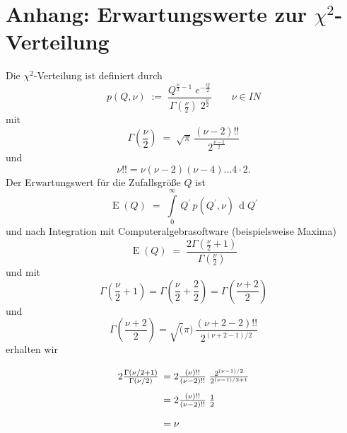 \section{Anhang: Erwartungswerte zur $\chi^2$-Verteilung}
\label{ErwaChi2}
Die $\chi^2$-Verteilung ist definiert durch
\begin{equation}
p(Q,\nu) \; := \; \frac{ Q^{\frac{\nu}{2}-1} \; e^{-\frac{Q}{2}}}
{\Gamma\left(\frac{\nu}{2}\right) \; 2^{\frac{\nu}{2}}} \qquad \nu \in I \! \! N
\end{equation}
mit
\begin{equation}
\Gamma\left(\frac{\nu}{2}\right) \; = \; \sqrt{\pi} \, \frac{(\nu-2)!!}{2^{\frac{\nu-1}{2}}}
\end{equation}
und
\begin{equation}
\nu!! = \nu (\nu-2) (\nu-4) ... 4 \cdot 2 .
\end{equation}
Der Erwartungswert für die Zufallsgröße $Q$ ist
\begin{equation}
\operatorname{E}(Q) \; = \; \int\limits_{0}^{\infty} \, Q^\prime \, p(Q^\prime,\nu) \,
\operatorname{d}Q^\prime
\end{equation}
und nach Integration mit Computeralgebrasoftware (beispielsweise Maxima)
\begin{equation}
\operatorname{E}(Q) \; = \; \frac{2 \Gamma\left(\frac{\nu}{2} + 1 \right)}{\Gamma\left(\frac{\nu}{2}\right)}
\end{equation}
und mit
$$
\Gamma\left(\frac{\nu}{2} + 1 \right) =
\Gamma\left(\frac{\nu}{2} + \frac{2}{2} \right) = \Gamma\left(\frac{\nu+2}{2}\right)
$$
und
$$
\Gamma\left(\frac{\nu+2}{2}\right) = \sqrt(\pi) \, \frac{(\nu+2-2)!!}{2^{(\nu+2-1)/2}}
$$
erhalten wir
\begin{equation}
\arraycolsep=2.4pt\def\arraystretch{2}
\begin{array}{ll}
2 \frac{\Gamma(\nu/2 + 1)}{\Gamma(\nu/2)}
 & = 2 \frac{(\nu)!!}{(\nu-2)!!} \; \frac{ 2^{(\nu-1)/2} }{ 2^{(\nu-1)/2 + 1}}\\
 & = 2 \frac{(\nu)!!}{(\nu-2)!!} \; \frac{1}{2} \\
 & = \nu
\end{array}
\end{equation}
